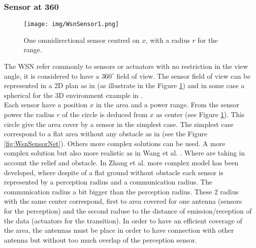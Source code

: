 \subsubsection{Sensor at 360}
%
	\begin{figure}[t!]
	\center
{}
   \texttt{[image: img/WsnSensor1.png]}
  \caption{One omnidirectional sensor centred on $x$, with a radius $r$ for the range.}\label{fig:WsnSensor1}
  \endminipage\hfill
\end{figure}

	

The WSN refer commonly to sensors or actuators  with no restriction in the view angle, it is considered to have a $360^\circ$ field of view. The sensor field of view can be represented in a 2D plan  as in \cite{200*kulkarni2011, 174*zhang2016,150*chakrabarty2002} (as illustrate in the Figure \ref{fig:WsnSensor1}) and in some case a spherical for the 3D environment example in \cite{175*medhi2013,59*wang2008}.  \\
Each sensor have a position $x$ in the area and a power range. From the sensor power  the radius $r$ of the circle is deduced from $x$ as center (see Figure \ref{fig:WsnSensor1}). This circle give the area cover by a sensor in the simplest case. 
The simplest case correspond to a flat area without any obstacle as in \cite{200*kulkarni2011,174*zhang2016} (see the Figure \ref{fig:WsnSensorNet}).  
Others more complex solutions can be used. A more complex solution but also more realistic as in Wang et al. \cite{59*wang2008}. Where are taking in account the relief and obstacle. 
In Zhang et al. \cite{174*zhang2016} more complex model has been developed, where despite of a flat ground without obstacle each sensor is represented by a perception radius and a communication radius. The communication radius a bit bigger than the perception radius. These 2 radius with the same center correspond, first to area covered for one antenna (sensors for the perception) and the second raduse to the distance of emission/reception of the data (actuators for the transition).  In order to have an efficient coverage of the area, the antennas must be place in order to have connection with other antenna but without too much overlap of the perception sensor.\\

